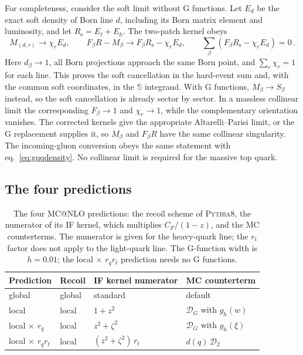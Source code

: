 \documentclass[a4paper,11pt]{article}
\makeatletter
\newcommand{\mcatnlo}{MC@NLO\xspace}
\newcommand{\pythia}{\textsc{Pythia8}\xspace}
\newcommand{\clS}{\mathbb{S}}
\newcommand{\Dens}{\mathcal{D}}
\newcommand{\glob}{global\xspace}
\newcommand{\loc}{local\xspace}
\newcommand{\locq}{local$\,{\times}\,r_q$\xspace}
\newcommand{\locqt}{local$\,{\times}\,r_qr_t$\xspace}
\makeatother
\begin{document}
For completeness, consider the soft limit without G functions. Let
$E_d$ be the exact soft density of Born line $d$, including its Born
matrix element and luminosity, and let $R_{\mathrm{s}}=E_\ell+E_h$.
The two-patch kernel obeys
\begin{equation}
 M_{(d,r)}\longrightarrow\chi_r E_d,\qquad
 F_\beta R-M_\beta\longrightarrow
 F_\beta R_{\mathrm{s}}-\chi_r E_d,\qquad
 \sum_\beta\left(F_\beta R_{\mathrm{s}}-\chi_r E_d\right)=0\,.
 \label{eq:softsum}
\end{equation}
Here $d_\beta\to1$, all Born projections approach the same Born
point, and $\sum_r\chi_r=1$ for each line. This proves the soft
cancellation in the hard-event sum and, with the common soft
coordinates, in the $\clS$ integrand. With G functions,
$M_\beta\to S_\beta$ instead, so the soft cancellation is already
sector by sector. In a massless collinear limit the corresponding
$F_\beta\to1$ and $\chi_r\to1$, while the complementary
orientation vanishes. The corrected kernels give the appropriate
Altarelli--Parisi limit, or the G replacement supplies it, so
$M_\beta$ and $F_\beta R$ have the same collinear singularity.
The incoming-gluon conversion obeys the same statement with
eq.~\eqref{eq:gqqdensity}. No collinear limit is required for the
massive top quark.

\subsection{The four predictions}
\label{sec:predictions}

\begin{table}[t]
  \centering
  \begin{tabular}{@{}llll@{}}
    \toprule
    Prediction & Recoil & IF kernel numerator & MC counterterm\\
    \midrule
    \glob & global & standard & default~\cite{Alwall:2014hca}\\
    \loc & local & $1+z^2$ & $\Dens_G$ with $g_h(w)$\\
    \locq & local & $z^2+\zeta^2$ & $\Dens_G$ with $g_h(\xi)$\\
    \locqt & local & $(z^2+\zeta^2)\,r_t$ & $d(q)\,\Dens_2$\\
    \bottomrule
  \end{tabular}
  \caption{The four \mcatnlo predictions: the recoil scheme of
    \pythia, the numerator of its IF kernel, which multiplies
    $C_F/(1-z)$, and the MC counterterms. The numerator is given for
    the heavy-quark line; the $r_t$ factor does not apply to the
    light-quark line. The G-function width is $h=0.01$; the \locqt
    prediction needs no G functions.}
  \label{tab:predictions}
\end{table}
\end{document}
